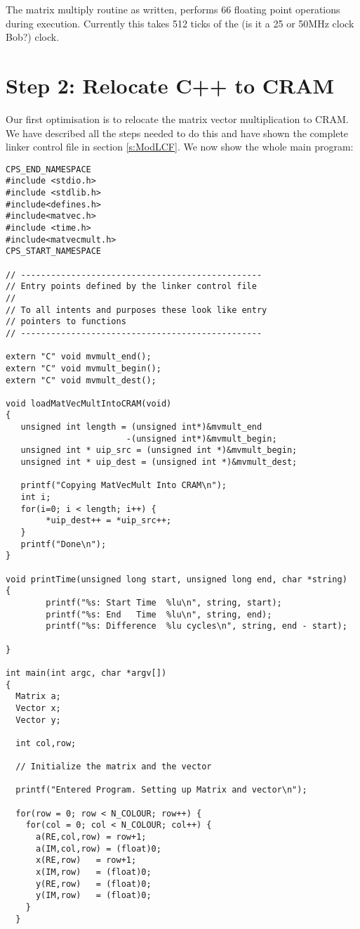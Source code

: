 The matrix multiply routine as written, performs 66 floating point
operations during execution. Currently this takes 512 ticks of the 
(is it a 25 or 50MHz clock Bob?) clock.

\section{Step 2: Relocate C++ to CRAM}
Our first optimisation is to relocate the matrix vector multiplication
to CRAM. We have described all the steps needed to do this and have
shown the complete linker control file in section \ref{s:ModLCF}. 
We now show the whole main program:
{\scriptsize
\begin{verbatim}
CPS_END_NAMESPACE
#include <stdio.h>
#include <stdlib.h>
#include<defines.h>
#include<matvec.h>
#include <time.h>
#include<matvecmult.h>
CPS_START_NAMESPACE

// ------------------------------------------------
// Entry points defined by the linker control file
//
// To all intents and purposes these look like entry
// pointers to functions
// ------------------------------------------------

extern "C" void mvmult_end();
extern "C" void mvmult_begin();
extern "C" void mvmult_dest();

void loadMatVecMultIntoCRAM(void)
{
   unsigned int length = (unsigned int*)&mvmult_end
                        -(unsigned int*)&mvmult_begin;
   unsigned int * uip_src = (unsigned int *)&mvmult_begin;
   unsigned int * uip_dest = (unsigned int *)&mvmult_dest;

   printf("Copying MatVecMult Into CRAM\n");
   int i;
   for(i=0; i < length; i++) {
        *uip_dest++ = *uip_src++;
   }   
   printf("Done\n");
}

void printTime(unsigned long start, unsigned long end, char *string)
{
        printf("%s: Start Time  %lu\n", string, start);
        printf("%s: End   Time  %lu\n", string, end);
        printf("%s: Difference  %lu cycles\n", string, end - start);

}

int main(int argc, char *argv[])
{
  Matrix a;
  Vector x;
  Vector y;

  int col,row;

  // Initialize the matrix and the vector

  printf("Entered Program. Setting up Matrix and vector\n");

  for(row = 0; row < N_COLOUR; row++) {
    for(col = 0; col < N_COLOUR; col++) {
      a(RE,col,row) = row+1;
      a(IM,col,row) = (float)0;
      x(RE,row)   = row+1;
      x(IM,row)   = (float)0;
      y(RE,row)   = (float)0;
      y(IM,row)   = (float)0;
    }
  }


\end{verbatim}}
